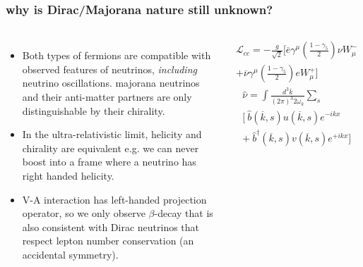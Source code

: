 \documentclass{beamer}
\begin{document}
		\begin{frame}
		\frametitle{why is Dirac/Majorana nature still unknown?}
		\begin{columns}[c] %
			
			\begin{itemize}
			\item Both types of fermions are compatible with observed features of neutrinos, \textit{including} neutrino oscillations. majorana neutrinos and their anti-matter partners are only distinguishable by their chirality.
			\item In the ultra-relativistic limit, helicity and chirality are equivalent e.g. we can never boost into a frame where a neutrino has right handed helicity.
			\item V-A interaction has left-handed projection operator, so we only observe $\beta$-decay that is also consistent with Dirac neutrinos that respect lepton number conservation (an accidental symmetry).
			\end{itemize}
			
			\begin{eqnarray*}
			\mathcal{L}_{cc} = -\frac{g}{\sqrt{2}}\bigg[\overline{e}\gamma^{\mu}\left(\frac{1-\gamma_5}{2}\right)\nu W^{-}_{\mu} \\
			+ \overline{\nu}\gamma^{\mu}\left(\frac{1-\gamma_5}{2}\right)e W^{+}_{\mu}\bigg]
			\end{eqnarray*}
			\begin{eqnarray*}
			\hat{\nu} = \int \frac{d^3 \overline{k}}{(2\pi)^3 2 \omega_k} \sum_s \\
			\bigg[\ \hat{b}(\overline{k},s)u(\overline{k},s)e^{-ikx} \\
			 + \ \hat{b}^{\dagger}(\overline{k},s)v(\overline{k},s)e^{+ikx} \bigg]
			\end{eqnarray*}
		\end{columns}
	\end{frame}	
	
\end{document}
